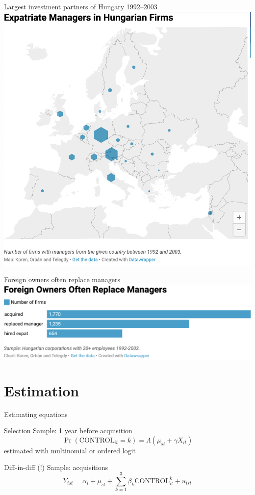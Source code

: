 \documentclass[
  ignorenonframetext,
  aspectratio=43,
]{beamer}
\begin{document}
\begin{frame}{Largest investment partners of Hungary 1992--2003}
\protect\hypertarget{largest-investment-partners-of-hungary-19922003}{}
\includegraphics{figure/map.png}
\end{frame}

\begin{frame}{Foreign owners often replace managers}
\protect\hypertarget{foreign-owners-often-replace-managers}{}
\includegraphics{figure/sample-size.png}
\end{frame}

\hypertarget{estimation}{%
\section{Estimation}\label{estimation}}

\begin{frame}{Estimating equations}
\protect\hypertarget{estimating-equations}{}
\begin{block}{Selection}
\protect\hypertarget{selection}{}
Sample: 1 year before acquisition \[
\Pr(\text{CONTROL}_{it}=k) = \Lambda(\mu_{st} + \gamma X_{it})
\] estimated with multinomial or ordered logit
\end{block}

\begin{block}{Diff-in-diff (!)}
\protect\hypertarget{diff-in-diff}{}
Sample: acquisitions \[
Y_{ist} = \alpha_i + \mu_{st} + \sum_{k=1}^3 \beta_k \text{CONTROL}_{it}^k + u_{ist}
\]
\end{block}
\end{frame}
\end{document}
